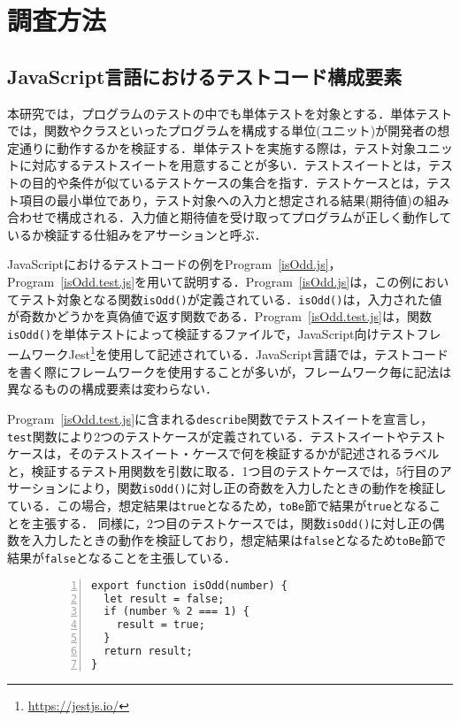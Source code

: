 \documentclass[11pt,dvipdfmx]{jreport}
\begin{document}
\section{調査方法}
\subsection{JavaScript言語におけるテストコード構成要素}
本研究では，プログラムのテストの中でも単体テストを対象とする．単体テストでは，関数やクラスといったプログラムを構成する単位(ユニット)が開発者の想定通りに動作するかを検証する．単体テストを実施する際は，テスト対象ユニットに対応するテストスイートを用意することが多い．テストスイートとは，テストの目的や条件が似ているテストケースの集合を指す．テストケースとは，テスト項目の最小単位であり，テスト対象への入力と想定される結果(期待値)の組み合わせで構成される．入力値と期待値を受け取ってプログラムが正しく動作しているか検証する仕組みをアサーションと呼ぶ．

JavaScriptにおけるテストコードの例をProgram~\ref{isOdd.js}，Program~\ref{isOdd.test.js}を用いて説明する．Program~\ref{isOdd.js}は，この例においてテスト対象となる関数{\verb|isOdd()|}が定義されている．{\verb|isOdd()|}は，入力された値が奇数かどうかを真偽値で返す関数である．Program~\ref{isOdd.test.js}は，関数{\verb|isOdd()|}を単体テストによって検証するファイルで，JavaScript向けテストフレームワークJest\footnote{\url{https://jestjs.io/}}を使用して記述されている．JavaScript言語では，テストコードを書く際にフレームワークを使用することが多いが，フレームワーク毎に記法は異なるものの構成要素は変わらない．

Program~\ref{isOdd.test.js}に含まれる{\verb|describe|}関数でテストスイートを宣言し，{\verb|test|}関数により2つのテストケースが定義されている．テストスイートやテストケースは，そのテストスイート・ケースで何を検証するかが記述されるラベルと，検証するテスト用関数を引数に取る．1つ目のテストケースでは，5行目のアサーションにより，関数{\verb|isOdd()|}に対し正の奇数を入力したときの動作を検証している．この場合，想定結果は{\verb|true|}となるため，{\verb|toBe|}節で結果が{\verb|true|}となることを主張する．
同様に，2つ目のテストケースでは，関数{\verb|isOdd()|}に対し正の偶数を入力したときの動作を検証しており，想定結果は{\verb|false|}となるため{\verb|toBe|}節で結果が{\verb|false|}となることを主張している．

\begin{figure}[t]
  \begin{lstlisting}[caption={[upper/lower text]%
             \begin{tabular}[t]{@{}l@{}}
              isOdd.js \\[1.0\normalbaselineskip]
             \end{tabular}},frame={tb},numbers=left,label=isOdd.js,identifierstyle={\small}]
export function isOdd(number) {
  let result = false;
  if (number % 2 === 1) {
    result = true;
  }
  return result;
}
\end{lstlisting}
\vspace{-6mm}
\end{figure}
\end{document}
